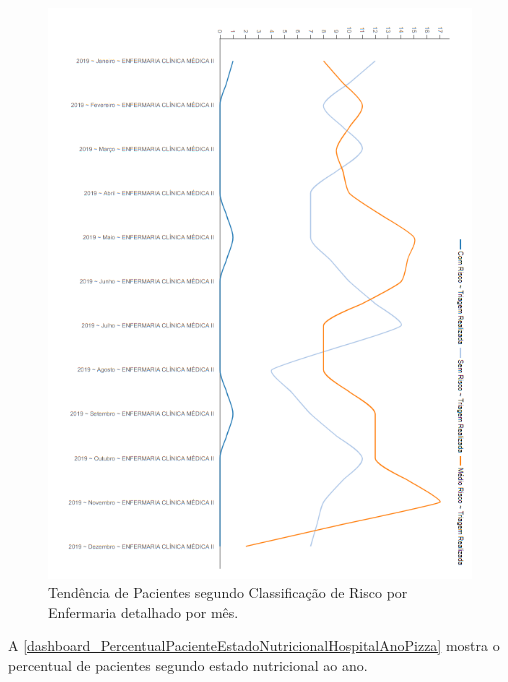 \begin{figure}[htb]
	\caption{\label{dashboard_PercentualPacientesClassificacaoRiscoEnfermariaMesLinha}Tendência de Pacientes segundo Classificação de Risco por Enfermaria detalhado por mês.}
	\begin{center}
	    \includegraphics[scale=0.9]{Imagens/2.4.PercentualPacientesClassificacaoRiscoEnfermariaMesLinha.png}
	\end{center}
\end{figure}

\newpage
A \autoref{dashboard_PercentualPacienteEstadoNutricionalHospitalAnoPizza} mostra o percentual de pacientes segundo estado nutricional ao ano.

